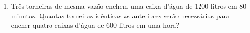 \documentclass[a4paper,14pt]{article}
\begin{document}
\begin{multicols}{2}
\begin{enumerate}
            \item Três torneiras de mesma vazão enchem uma caixa d’água de 1200 litros em 80 minutos. Quantas torneiras idênticas às anteriores serão necessárias para encher quatro caixas d'água de 600 litros em uma hora? \\\\\\\\\\\\\\\\\\\\\\\\\\\\\\
            

\end{enumerate}
\end{multicols}
\end{document}
